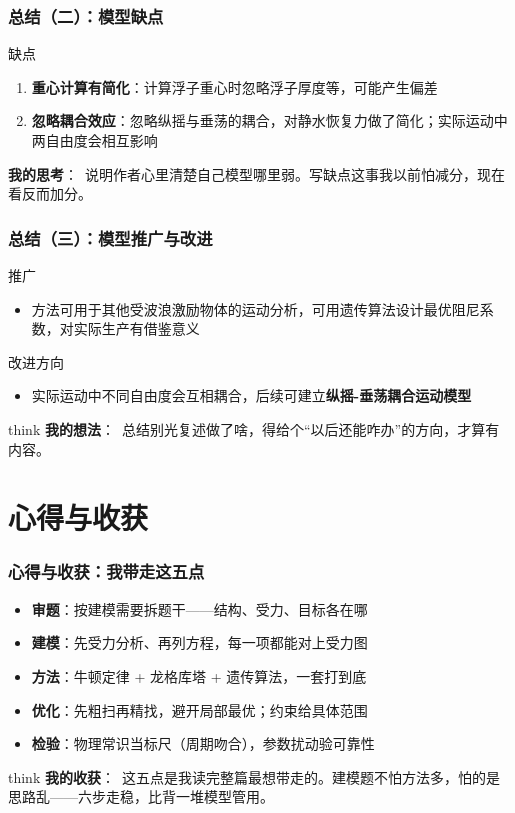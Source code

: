 \documentclass[aspectratio=169]{beamer}
\newcommand{\remark}[2]{%
	\vspace{0.12cm}%
	\begin{beamercolorbox}[rounded=true,sep=6pt]{think}%
		{\color{orchidpurple}\textbf{#1}：}~#2%
	\end{beamercolorbox}%
}
\newcommand{\remarkp}[2]{%
	\vspace{0.12cm}%
	{\color{orchidpurple}\textbf{#1}：}~#2\par%
}
\begin{document}
\begin{frame}
	\frametitle{总结（二）：模型缺点}
	\scriptsize
	\begin{block}{缺点}
		\begin{enumerate}
			\item \textbf{重心计算有简化}：计算浮子重心时忽略浮子厚度等，可能产生偏差
			\item \textbf{忽略耦合效应}：忽略纵摇与垂荡的耦合，对静水恢复力做了简化；实际运动中两自由度会相互影响
		\end{enumerate}
	\end{block}
	\remarkp{我的思考}{说明作者心里清楚自己模型哪里弱。写缺点这事我以前怕减分，现在看反而加分。}
\end{frame}

\begin{frame}
	\frametitle{总结（三）：模型推广与改进}
	\scriptsize
	\begin{block}{推广}
		\begin{itemize}
			\item 方法可用于其他受波浪激励物体的运动分析，可用遗传算法设计最优阻尼系数，对实际生产有借鉴意义
		\end{itemize}
	\end{block}
	\begin{block}{改进方向}
		\begin{itemize}
			\item 实际运动中不同自由度会互相耦合，后续可建立\textbf{纵摇-垂荡耦合运动模型}
		\end{itemize}
	\end{block}
	\remark{我的想法}{总结别光复述做了啥，得给个“以后还能咋办”的方向，才算有内容。}
\end{frame}

\section{心得与收获}
\begin{frame}
	\frametitle{心得与收获：我带走这五点}
	\scriptsize
	\begin{itemize}
		\item \textbf{审题}：按建模需要拆题干——结构、受力、目标各在哪
		\item \textbf{建模}：先受力分析、再列方程，每一项都能对上受力图
		\item \textbf{方法}：牛顿定律 + 龙格库塔 + 遗传算法，一套打到底
		\item \textbf{优化}：先粗扫再精找，避开局部最优；约束给具体范围
		\item \textbf{检验}：物理常识当标尺（周期吻合），参数扰动验可靠性
	\end{itemize}
	\remark{我的收获}{这五点是我读完整篇最想带走的。建模题不怕方法多，怕的是思路乱——六步走稳，比背一堆模型管用。}
\end{frame}
\end{document}
